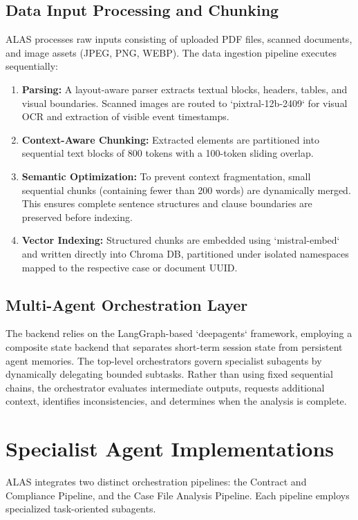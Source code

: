 \subsection{Data Input Processing and Chunking}
ALAS processes raw inputs consisting of uploaded PDF files, scanned documents, and image assets (JPEG, PNG, WEBP). The data ingestion pipeline executes sequentially:
\begin{enumerate}
\item \textbf{Parsing:} A layout-aware parser extracts textual blocks, headers, tables, and visual boundaries. Scanned images are routed to `pixtral-12b-2409` for visual OCR and extraction of visible event timestamps.
\item \textbf{Context-Aware Chunking:} Extracted elements are partitioned into sequential text blocks of 800 tokens with a 100-token sliding overlap.
\item \textbf{Semantic Optimization:} To prevent context fragmentation, small sequential chunks (containing fewer than 200 words) are dynamically merged. This ensures complete sentence structures and clause boundaries are preserved before indexing.
\item \textbf{Vector Indexing:} Structured chunks are embedded using `mistral-embed` and written directly into Chroma DB, partitioned under isolated namespaces mapped to the respective case or document UUID.
\end{enumerate}

\subsection{Multi-Agent Orchestration Layer}
The backend relies on the LangGraph-based `deepagents` framework, employing a composite state backend that separates short-term session state from persistent agent memories. The top-level orchestrators govern specialist subagents by dynamically delegating bounded subtasks. Rather than using fixed sequential chains, the orchestrator evaluates intermediate outputs, requests additional context, identifies inconsistencies, and determines when the analysis is complete.

\section{Specialist Agent Implementations}
ALAS integrates two distinct orchestration pipelines: the Contract and Compliance Pipeline, and the Case File Analysis Pipeline. Each pipeline employs specialized task-oriented subagents.

